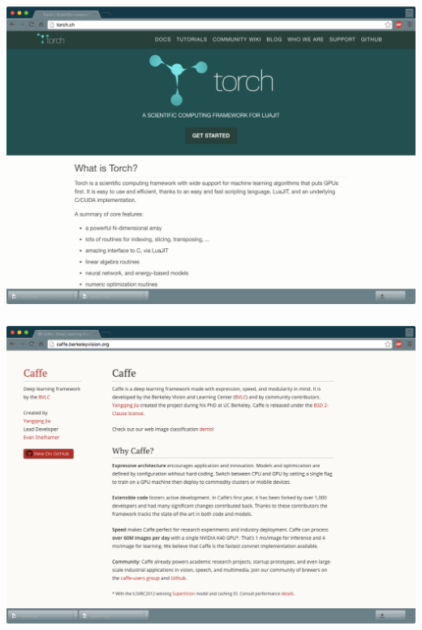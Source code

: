\documentclass[xetex,mathserif,serif,aspectratio=169]{beamer}
\begin{document}
\begin{frame}[fragile] \frametitle{} \oldB \small

\includegraphics[width=\textwidth]{img/torch.pdf}

\end{frame}

\begin{frame}[fragile] \frametitle{} \oldB \small

\includegraphics[width=\textwidth]{img/caffee.pdf}

\end{frame}
\end{document}
